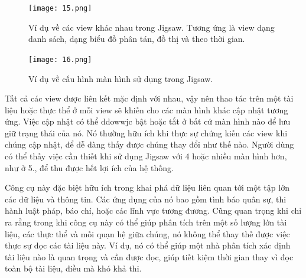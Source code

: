 \documentclass[13pt]{scrartcl} %
\begin{document}
\begin{figure}[!ht] %
    \centering
    \texttt{[image: 15.png]}
    \caption{Ví dụ về các view khác nhau trong Jigsaw. Tương ứng là view dạng danh sách, dạng biểu đồ phân tán, đồ thị và theo thời gian.}
\end{figure}

\begin{figure}[!ht] %
    \centering
    \texttt{[image: 16.png]}
    \caption{Ví dụ về cấu hình màn hình sử dụng trong Jigsaw. }
\end{figure}

Tất cả các view được liên kết mặc định với nhau, vậy nên thao tác trên một tài liệu hoặc thực thể ở mỗi view sẽ khiến cho các màn hình khác cập nhật tương ứng. Việc cập nhật có thể ddowwjc bật hoặc tắt ở bất cứ màn hình nào để lưu giữ trạng thái của nó. Nó thường hữu ích khi thực sự chứng kiến các view khi chúng cập nhật, để dễ dàng thấy được chúng thay đổi như thế nào. Người dùng có thể thấy việc cần thiết khi sử dụng Jigsaw với 4 hoặc nhiều màn hình hơn, như ở 5., để thu được hết lợi ích của hệ thống.

Công cụ này đặc biệt hữu ích trong khai phá dữ liệu liên quan tới một tập lớn các dữ liệu và thông tin. Các ứng dụng của nó bao gồm tình báo quân sự, thi hành luật pháp, báo chí, hoặc các lĩnh vực tương đương. Cũng quan trọng khi chỉ ra rằng trong khi công cụ này có thể giúp phân tích trên một số lượng lớn tài liệu, các thực thể và mối quạn hệ giữa chúng, nó không thể thay thế được việc thực sự đọc các tài liệu này. Ví dụ, nó có thể giúp một nhà phân tích xác định tài liệu nào là quan trọng và cần được đọc, giúp tiết kiệm thời gian thay vì đọc toàn bộ tài liệu, điều mà khó khả thi.
\end{document}
